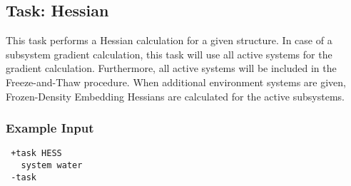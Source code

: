 \subsection{Task: Hessian}
This task performs a Hessian calculation for a given structure. In case of a subsystem gradient calculation, this task will use all active systems for the gradient calculation. Furthermore, all active systems will be included in the Freeze-and-Thaw procedure. When additional environment systems are given, Frozen-Density Embedding Hessians are calculated for the active subsystems.
\subsubsection{Example Input}
\begin{lstlisting}
 +task HESS
   system water
 -task
\end{lstlisting}

